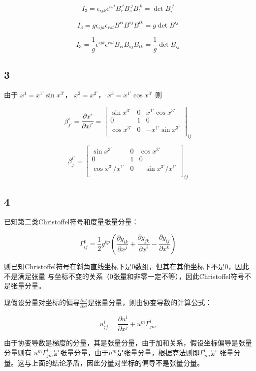 \documentclass[UTF8,zihao=5]{ctexart}
\newcommand*{\pd}[2]{\frac{\partial #1}{\partial #2}}
\begin{document}
$$
I_3
=\epsilon_{ijk}\epsilon^{rst}B_{r}^{\cdot i}B_{s}^{\cdot j}B_{t}^{\cdot k}=\det{B_i^{\cdot j}}
$$

$$
I_3
=g\epsilon_{ijk}\epsilon_{rst}B^{ri}B^{sj}B^{tk}=g\det{B^{ij}}
$$

$$
I_3
=\frac{1}{g}\epsilon^{ijk}\epsilon^{rst}B_{ri}B_{sj}B_{tk}=\frac{1}{g}\det{B_{ij}}
$$

\subsection*{3}

由于
$x^1=x^{1'}\sin{x^{3'}}$，
$x^2=x^{2'}$，
$x^3=x^{1'}\cos{x^{3'}}$
则

$$
\beta^{i}_{j'}
=
\frac{\partial x^i}{\partial x^{j'}}
=
\begin{bmatrix}
    \sin{x^{3'}}&0&x^{1'}\cos{x^{3'}}\\
    0&1&0\\
    \cos{x^{3'}}&0&-x^{1'}\sin{x^{3'}}\\
\end{bmatrix}_{ij}
$$

$$
\beta^{i'}_{j}
=
\begin{bmatrix}
    \sin{x^{3'}}&0&\cos{x^{3'}}\\
    0&1&0\\
    \cos{x^{3'}}/x^{1'}&0&-\sin{x^{3'}}/x^{1'}\\
\end{bmatrix}_{ij}
$$

\subsection*{4}

已知第二类Christoffel符号和度量张量分量：

$$
\Gamma^p_{ij}=\frac{1}{2}g^{kp}\left(
\pd{g_{ik}}{x^j}+\pd{g_{jk}}{x^i}
-\pd{g_{ij}}{x^k}
\right)
$$

则已知Christoffel符号在斜角直线坐标下是0数组，但其在其他坐标下不是0，因此不是满足张量
与坐标不变的关系（0张量和非零一定不等），因此Christoffel符号不是张量分量。

现假设分量对坐标的偏导$\pd{u^i}{x^j}$是张量分量，则由协变导数的计算公式：

$$
u^i_{;j}=\pd{u^i}{x^j}+u^{m}\Gamma^i_{jm}
$$

由于协变导数是梯度的分量，其是张量分量，由于加和关系，假设坐标偏导是张量分量则有
$u^{m}\Gamma^i_{jm}$是张量分量，由于$u^m$是张量分量，根据商法则即$\Gamma^i_{jm}$是
张量分量。这与上面的结论矛盾，因此分量对坐标的偏导不是张量分量。
\end{document}
